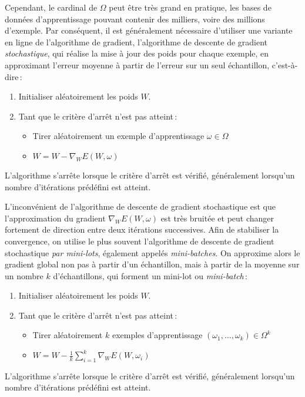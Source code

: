  Cependant, le cardinal de $\Omega$ peut être très grand en pratique, les bases de données d'apprentissage pouvant contenir des milliers, voire des millions d'exemple. Par conséquent, il est généralement nécessaire d'utiliser une variante en ligne de l'algorithme de gradient, l'algorithme de descente de gradient \emph{stochastique}, qui réalise la mise à jour des poids pour chaque exemple, en approximant l'erreur moyenne à partir de l'erreur sur un seul échantillon, c'est-à-dire\,:
\begin{theorem}
  \begin{enumerate}
    \item Initialiser aléatoirement les poids $W$.
    \item Tant que le critère d'arrêt n'est pas atteint\,:
      \begin{itemize}
          \item Tirer aléatoirement un exemple d'apprentissage $\omega \in \Omega$
          \item $W = W - \nabla_W E(W, \omega)$
      \end{itemize}
  \end{enumerate}
L'algorithme s'arrête lorsque le critère d'arrêt est vérifié, généralement lorsqu'un nombre d'itérations prédéfini est atteint.
\end{theorem}

L'inconvénient de l'algorithme de descente de gradient stochastique est que l'approximation du gradient $\nabla_W E(W, \omega)$ est très bruitée et peut changer fortement de direction entre deux itérations successives. Afin de stabiliser la convergence, on utilise le plus souvent l'algorithme de descente de gradient stochastique \emph{par mini-lots}, également appelés \emph{mini-batches}. On approxime alors le gradient global non pas à partir d'un échantillon, mais à partir de la moyenne sur un nombre $k$ d'échantillons, qui forment un mini-lot ou \emph{mini-batch}\,:
\begin{theorem}
  \begin{enumerate}
    \item Initialiser aléatoirement les poids $W$.
    \item Tant que le critère d'arrêt n'est pas atteint\,:
      \begin{itemize}
          \item Tirer aléatoirement $k$ exemples d'apprentissage $(\omega_1,\dots,\omega_k) \in \Omega^k$
          \item $W = W - \frac{1}{k} \sum_{i=1}^k \nabla_W E(W, \omega_i)$
      \end{itemize}
  \end{enumerate}
L'algorithme s'arrête lorsque le critère d'arrêt est vérifié, généralement lorsqu'un nombre d'itérations prédéfini est atteint.
\end{theorem}

